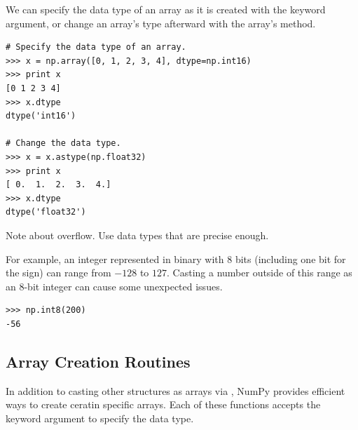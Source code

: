 We can specify the data type of an array as it is created with the  keyword argument, or change an array's type afterward with the array's  method.

\begin{lstlisting}
# Specify the data type of an array.
>>> x = np.array([0, 1, 2, 3, 4], dtype=np.int16)
>>> print x
[0 1 2 3 4]
>>> x.dtype
dtype('int16')

# Change the data type.
>>> x = x.astype(np.float32)
>>> print x
[ 0.  1.  2.  3.  4.]
>>> x.dtype
dtype('float32')
\end{lstlisting}

\begin{warn}
Note about overflow.
Use data types that are precise enough.

For example, an integer represented in binary with 8 bits (including one bit for the sign) can range from $-128$ to $127$.
Casting a number outside of this range as an 8-bit integer can cause some unexpected issues.

\begin{lstlisting}
>>> np.int8(200)
-56
\end{lstlisting}
\end{warn}

\subsection*{Array Creation Routines} %

In addition to casting other structures as arrays via , NumPy provides efficient ways to create ceratin specific arrays.
Each of these functions accepts the  keyword argument to specify the data type.

